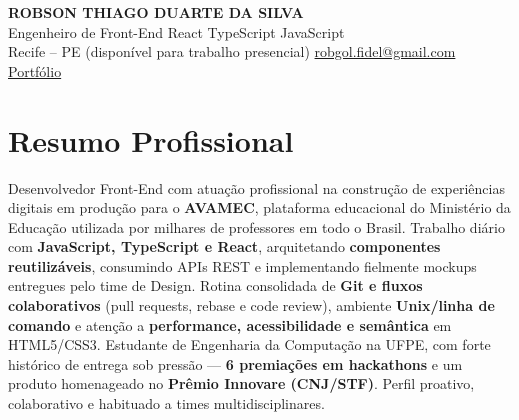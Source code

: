 \documentclass[a4paper,10.5pt]{article}
\begin{document}
\begin{center}
  {\LARGE\bfseries\color{primary} ROBSON THIAGO DUARTE DA SILVA}\\[3pt]
  {\large Engenheiro de Front-End \textbar{} React \textbar{} TypeScript \textbar{} JavaScript}\\[5pt]
  \small
  Recife -- PE (disponível para trabalho presencial) \textbar{}
  \href{mailto:robgol.fidel@gmail.com}{robgol.fidel@gmail.com} \textbar{}
  \href{https://sites.google.com/cin.ufpe.br/rtds/p\%C3\%A1gina-inicial}{Portfólio}
\end{center}

\vspace{-0.3em}

\section{Resumo Profissional}
Desenvolvedor Front-End com atuação profissional na construção de experiências digitais em produção para o
\textbf{AVAMEC}, plataforma educacional do Ministério da Educação utilizada por milhares de professores em todo o
Brasil. Trabalho diário com \textbf{JavaScript, TypeScript e React}, arquitetando \textbf{componentes reutilizáveis},
consumindo APIs REST e implementando fielmente mockups entregues pelo time de Design. Rotina consolidada de
\textbf{Git e fluxos colaborativos} (pull requests, rebase e code review), ambiente \textbf{Unix/linha de comando} e
atenção a \textbf{performance, acessibilidade e semântica} em HTML5/CSS3. Estudante de Engenharia da Computação na
UFPE, com forte histórico de entrega sob pressão --- \textbf{6 premiações em hackathons} e um produto homenageado no
\textbf{Prêmio Innovare (CNJ/STF)}. Perfil proativo, colaborativo e habituado a times multidisciplinares.

\end{document}

